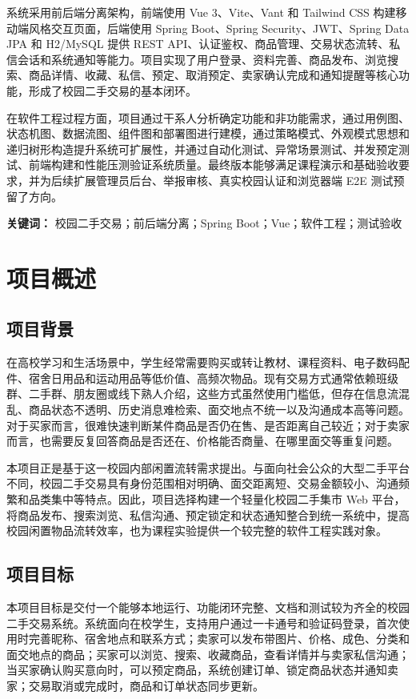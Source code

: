﻿\documentclass[UTF8,a4paper,12pt]{ctexart}
\begin{document}
系统采用前后端分离架构，前端使用 Vue 3、Vite、Vant 和 Tailwind CSS 构建移动端风格交互页面，后端使用 Spring Boot、Spring Security、JWT、Spring Data JPA 和 H2/MySQL 提供 REST API、认证鉴权、商品管理、交易状态流转、私信会话和系统通知等能力。项目实现了用户登录、资料完善、商品发布、浏览搜索、商品详情、收藏、私信、预定、取消预定、卖家确认完成和通知提醒等核心功能，形成了校园二手交易的基本闭环。

在软件工程过程方面，项目通过干系人分析确定功能和非功能需求，通过用例图、状态机图、数据流图、组件图和部署图进行建模，通过策略模式、外观模式思想和递归树形构造提升系统可扩展性，并通过自动化测试、异常场景测试、并发预定测试、前端构建和性能压测验证系统质量。最终版本能够满足课程演示和基础验收要求，并为后续扩展管理员后台、举报审核、真实校园认证和浏览器端 E2E 测试预留了方向。

\noindent\textbf{关键词：}
校园二手交易；前后端分离；Spring Boot；Vue；软件工程；测试验收

\newpage
\tableofcontents
\newpage


\section{项目概述}

\subsection{项目背景}
在高校学习和生活场景中，学生经常需要购买或转让教材、课程资料、电子数码配件、宿舍日用品和运动用品等低价值、高频次物品。现有交易方式通常依赖班级群、二手群、朋友圈或线下熟人介绍，这些方式虽然使用门槛低，但存在信息流混乱、商品状态不透明、历史消息难检索、面交地点不统一以及沟通成本高等问题。对于买家而言，很难快速判断某件商品是否仍在售、是否距离自己较近；对于卖家而言，也需要反复回答商品是否还在、价格能否商量、在哪里面交等重复问题。

本项目正是基于这一校园内部闲置流转需求提出。与面向社会公众的大型二手平台不同，校园二手交易具有身份范围相对明确、面交距离短、交易金额较小、沟通频繁和品类集中等特点。因此，项目选择构建一个轻量化校园二手集市 Web 平台，将商品发布、搜索浏览、私信沟通、预定锁定和状态通知整合到统一系统中，提高校园闲置物品流转效率，也为课程实验提供一个较完整的软件工程实践对象。

\subsection{项目目标}
本项目目标是交付一个能够本地运行、功能闭环完整、文档和测试较为齐全的校园二手交易系统。系统面向在校学生，支持用户通过一卡通号和验证码登录，首次使用时完善昵称、宿舍地点和联系方式；卖家可以发布带图片、价格、成色、分类和面交地点的商品；买家可以浏览、搜索、收藏商品，查看详情并与卖家私信沟通；当买家确认购买意向时，可以预定商品，系统创建订单、锁定商品状态并通知卖家；交易取消或完成时，商品和订单状态同步更新。
\end{document}
